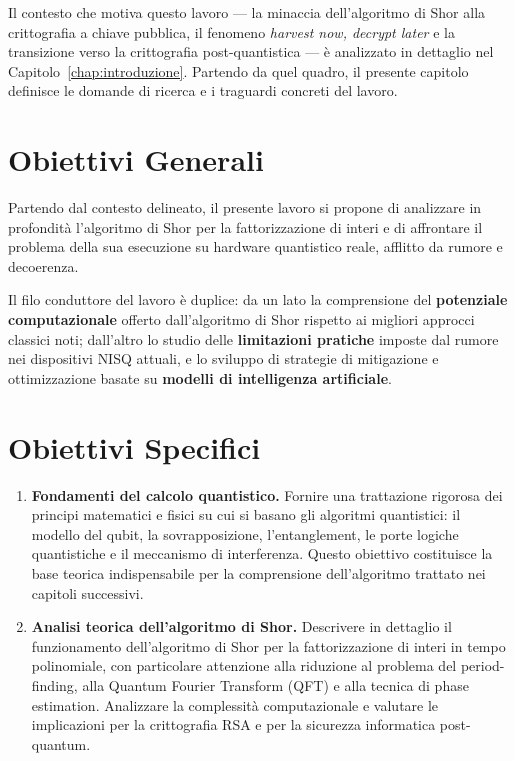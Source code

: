 \begin{onehalfspace}

Il contesto che motiva questo lavoro --- la minaccia dell'algoritmo di Shor alla crittografia a chiave pubblica, il fenomeno \textit{harvest now, decrypt later} e la transizione verso la crittografia post-quantistica --- è analizzato in dettaglio nel Capitolo~\ref{chap:introduzione}. Partendo da quel quadro, il presente capitolo definisce le domande di ricerca e i traguardi concreti del lavoro.

\section{Obiettivi Generali}

Partendo dal contesto delineato, il presente lavoro si propone di analizzare in profondità l'algoritmo di Shor per la fattorizzazione di interi e di affrontare il problema della sua esecuzione su hardware quantistico reale, afflitto da rumore e decoerenza.

Il filo conduttore del lavoro è duplice: da un lato la comprensione del \textbf{potenziale computazionale} offerto dall'algoritmo di Shor rispetto ai migliori approcci classici noti; dall'altro lo studio delle \textbf{limitazioni pratiche} imposte dal rumore nei dispositivi \ac{NISQ} attuali, e lo sviluppo di strategie di mitigazione e ottimizzazione basate su \textbf{modelli di intelligenza artificiale}.

\section{Obiettivi Specifici}

\begin{enumerate}

    \item \textbf{Fondamenti del calcolo quantistico.}
    Fornire una trattazione rigorosa dei principi matematici e fisici su cui si basano gli algoritmi quantistici: il modello del qubit, la sovrapposizione, l'entanglement, le porte logiche quantistiche e il meccanismo di interferenza. Questo obiettivo costituisce la base teorica indispensabile per la comprensione dell'algoritmo trattato nei capitoli successivi.

    \item \textbf{Analisi teorica dell'algoritmo di Shor.}
    Descrivere in dettaglio il funzionamento dell'algoritmo di Shor per la fattorizzazione di interi in tempo polinomiale, con particolare attenzione alla riduzione al problema del period-finding, alla Quantum Fourier Transform (\ac{QFT}) e alla tecnica di phase estimation. Analizzare la complessità computazionale e valutare le implicazioni per la crittografia \ac{RSA} e per la sicurezza informatica post-quantum.


\end{enumerate}
\end{onehalfspace}
